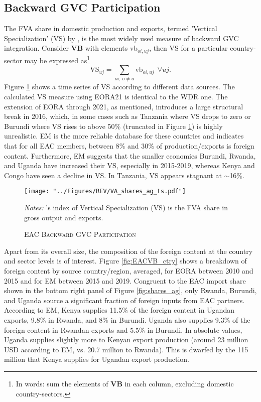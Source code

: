 \documentclass[a4paper]{article}
\begin{document}
\subsection{Backward GVC Participation}

The FVA share in domestic production and exports, termed 'Vertical Specialization' (VS) by \citet{hummels2001nature}, is the most widely used measure of backward GVC integration. Consider \textbf{VB} with elements vb$_{oi,uj}$, then VS for a particular country-sector may be expressed as\footnote{In words: sum the elements of \textbf{VB} in each column, excluding domestic country-sectors.}
%
\begin{equation} \label{eq:VS}
\text{VS}_{uj} = \sum_{oi,\ o \neq  u} \text{vb}_{oi, uj}\ \ \forall uj.
\end{equation}
%
Figure \ref{fig:EACVB_ag_ts} shows a time series of VS according to different data sources. The calculated VS measure using EORA21 is identical to the WDR one. The extension of EORA through 2021, as mentioned, introduces a large structural break in 2016, which, in some cases such as Tanzania where VS drops to zero or Burundi where VS rises to above 50\% (truncated in Figure \ref{fig:EACVB_ag_ts}) is highly unrealistic. EM is the more reliable database for these countries and indicates that for all EAC members, between 8\% and 30\% of production/exports is foreign content. Furthermore, EM suggests that the smaller economies Burundi, Rwanda, and Uganda have increased their VS, especially in 2015-2019, whereas Kenya and Congo have seen a decline in VS. In Tanzania, VS appears stagnant at $\sim$16\%. 

\begin{figure}[h!]
\centering
\caption{\label{fig:EACVB_ag_ts}\textsc{EAC Backward GVC Participation}}
\texttt{[image: "../Figures/REV/VA\_shares\_ag\_ts.pdf"]} \raggedright
\scriptsize
\emph{Notes:} \citet{hummels2001nature}'s index of Vertical Specialization (VS) is the FVA share in gross output and exports. 
\end{figure}
\FloatBarrier

Apart from its overall size, the composition of the foreign content at the country and sector levels is of interest. Figure \ref{fig:EACVB_ctry} shows a breakdown of foreign content by source country/region, averaged, for EORA between 2010 and 2015 and for EM between 2015 and 2019. Congruent to the EAC import share shown in the bottom right panel of Figure \ref{fig:shares_ag}, only Rwanda, Burundi, and Uganda source a significant fraction of foreign inputs from EAC partners. According to EM, Kenya supplies 11.5\% of the foreign content in Ugandan exports, 9.8\% in Rwanda, and 8\% in Burundi. Uganda also supplies 9.3\% of the foreign content in Rwandan exports and 5.5\% in Burundi. In absolute values, Uganda supplies slightly more to Kenyan export production (around 23 million USD according to EM, vs. 20.7 million to Rwanda). This is dwarfed by the 115 million that Kenya supplies for Ugandan export production. \newline 
\end{document}
